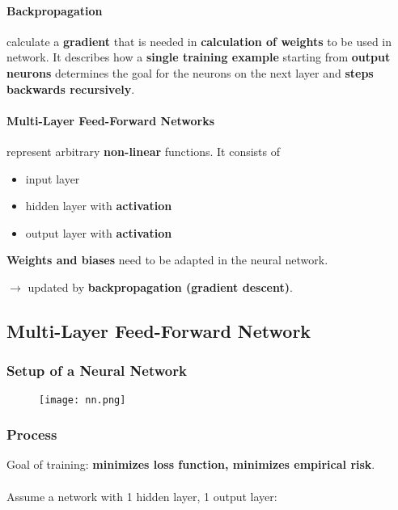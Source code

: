\paragraph{Backpropagation} calculate a \textbf{gradient} that is needed in \textbf{calculation of weights} to be used in network. It describes how a \textbf{single training example} starting from \textbf{output neurons} determines the goal for the neurons on the next layer and \textbf{steps backwards recursively}.

\paragraph{Multi-Layer Feed-Forward Networks} represent arbitrary \textbf{non-linear} functions. It consists of
\begin{itemize}
	\item input layer
	\item hidden layer with \textbf{activation}
	\item output layer with \textbf{activation}
\end{itemize}
\textbf{Weights and biases} need to be adapted in the neural network. 

$\rightarrow$ updated by \textbf{backpropagation (gradient descent)}.

\subsection{Multi-Layer Feed-Forward Network}
\subsubsection{Setup of a Neural Network}
\begin{figure}[H]
	\centering
	\texttt{[image: nn.png]}
\end{figure}

\subsubsection{Process}
Goal of training: \textbf{minimizes loss function, minimizes empirical risk}.
\\ \ \\
Assume a network with 1 hidden layer, 1 output layer:

